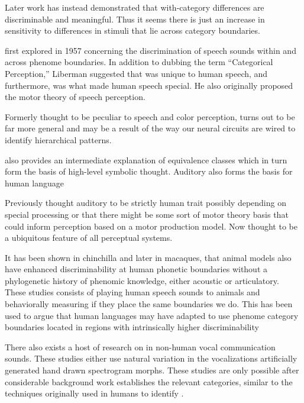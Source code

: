 Later work has instead demonstrated that with-category differences are discriminable\cite{pisoni1974reaction,carney1977noncategorical,massaro1983categorical} and meaningful\cite{miller1997internal,mcmurray2002gradient,mcmurray2008gradient}. Thus it seems there is just an increase in sensitivity to differences in stimuli that lie across category boundaries.

\CP first explored in 1957 concerning the discrimination of speech sounds within and across phenome boundaries\cite{liberman1957discrimination}.  In addition to dubbing the term ``Categorical Perception,'' Liberman suggested that \CP was unique to human speech, and furthermore, was what made human speech special. He also originally proposed the motor theory of speech perception\cite{liberman1967perception}.

Formerly thought to be peculiar to speech and color perception, \CP turns out to be far more general and may be a result of the way our neural circuits are wired to identify hierarchical patterns.

\CP also provides an intermediate explanation of equivalence classes which in turn form the basis of high-level symbolic thought.
Auditory \CP also forms the basis for human language

Previously thought auditory \CP to be strictly human trait possibly depending on special processing or that there might be some sort of motor theory basis that could inform perception based on a motor production model.
Now thought to be a ubiquitous feature of all perceptual systems.

It has been shown in chinchilla\cite{kuhl1975speech} and later in macaques\cite{kuhl1983enhanced}, that animal models also have enhanced discriminability at human phonetic boundaries without a phylogenetic history of phenomic knowledge, either acoustic or articulatory.
These studies consists of playing human speech sounds to animals and behaviorally measuring if they place the same boundaries we do.
This has been used to argue that human languages may have adapted to use phenome category boundaries located in regions with intrinsically higher discriminability\cite{stevens1981constraints,goldstone2010categorical}

There also exists a host of research on \CP in non-human vocal communication sounds. These studies either use
natural variation in the vocalizations
artificially generated hand drawn spectrogram morphs.
These studies are only possible after considerable background work establishes the relevant categories, similar to the techniques originally used in humans to identify \CP.

